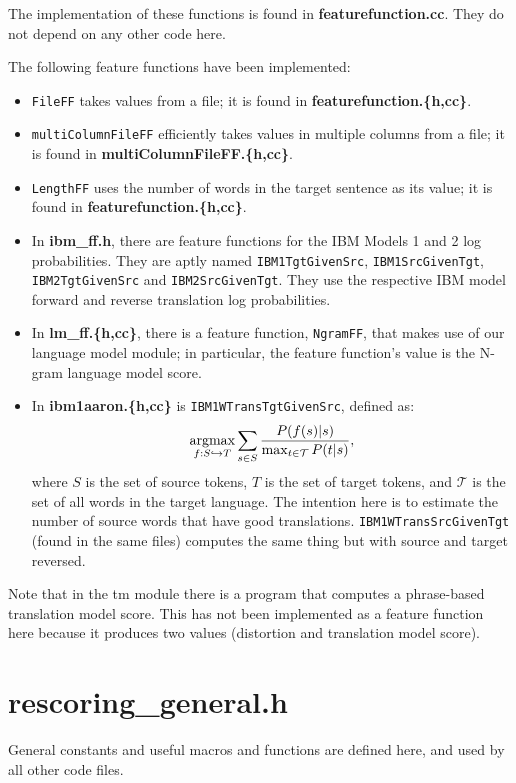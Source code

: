 \documentclass[12pt]{amsart}
\newcommand{\argmax}{\mathop{\rm argmax}}
\newcommand{\file}{\textbf} \newcommand{\url}{\underline}
\newcommand{\code}[1]{{\small \texttt{#1}}}
\begin{document}
The implementation of these functions is found in \file{featurefunction.cc}.
They do not depend on any other code here.

The following feature functions have been implemented:
\begin{itemize}
\item \code{FileFF} takes values from a file; it is found in
      \file{featurefunction.\{h,cc\}}.
\item \code{multiColumnFileFF} efficiently takes values in multiple columns
      from a file; it is found in \file{multiColumnFileFF.\{h,cc\}}.
\item \code{LengthFF} uses the number of words in the target sentence as its
      value; it is found in \file{featurefunction.\{h,cc\}}.
\item In \file{ibm\_ff.h}, there are feature functions for the IBM Models 1 and
      2 log probabilities.  They are aptly named \code{IBM1TgtGivenSrc},
      \code{IBM1SrcGivenTgt}, \code{IBM2TgtGivenSrc} and
      \code{IBM2SrcGivenTgt}.  They use the respective IBM model forward and
      reverse translation log probabilities.
\item In \file{lm\_ff.\{h,cc\}}, there is a feature function,
      \code{NgramFF}, that makes use of our language model module; in
      particular, the feature function's value is the N-gram language model
      score.
\item In \file{ibm1aaron.\{h,cc\}} is \code{IBM1WTransTgtGivenSrc}, defined as:
  \[ \argmax_{f:S \hookrightarrow T} \sum_{s \in S} \frac{P(f(s)|s)}{\max_{t
  \in \mathcal{T}} P(t|s)}, \] where $S$ is the set of source tokens, $T$ is
  the set of target tokens, and $\mathcal{T}$ is the set of all words in the
  target language.  The intention here is to estimate the number of source
  words that have good translations.  \code{IBM1WTransSrcGivenTgt} (found in
  the same files) computes the same thing but with source and target reversed.
\end{itemize}

Note that in the tm module there is a program that computes a phrase-based
translation model score.  This has not been implemented as a feature function
here because it produces two values (distortion and translation model score).

\section*{\file{rescoring\_general.h}}

General constants and useful macros and functions are defined here, and used by
all other code files.
\end{document}
